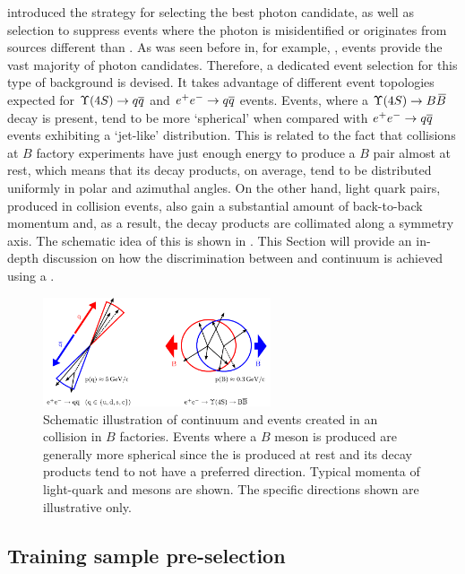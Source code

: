  introduced the strategy for selecting the best photon candidate, 
as well as selection to suppress events 
where the photon is misidentified or originates from sources different than \BtoXsgamma.
As was seen before in, for example, ,
\epem\ra\qqbar events provide the vast majority of photon candidates.
Therefore, a dedicated event selection for this type of background is devised.
It takes advantage of different event topologies expected for $\FourS\to\qqbar$ and $e^+e^-\rightarrow q\overline q$ events.
Events, where a $\FourS\to\BB$ decay is present, tend to be more `spherical' when compared with $e^+e^-\rightarrow q\overline q$ events exhibiting a `jet-like' distribution.
This is related to the fact that \epem collisions at $B$ factory experiments have just enough energy to produce a $B$ pair almost at rest, which means that its decay products, on average, tend to be distributed uniformly in polar and azimuthal angles.
On the other hand, light quark pairs, produced in \epem collision events, also gain a substantial amount of back-to-back momentum and, as a result, the decay products are collimated along a symmetry axis. 
The schematic idea of this is shown in .
This Section will provide an in-depth discussion on how the discrimination between \BtoXsgamma and continuum is achieved using a \BDT.

\begin{figure}[hbtp!]
    \centering
    \includegraphics[width=0.6\textwidth]{figures/continuum_suppression/figure_continuum_suppression_event_shapes.pdf}
    \caption{\label{fig:continuum_schematic} Schematic illustration of continuum and \BB events created in an \epem collision in $B$ factories.
    Events where a $B$ meson is produced are generally more spherical since the \FourS is produced at rest and its decay products tend to not have a preferred direction.
    Typical momenta of light-quark and \BB mesons are shown.
    The specific directions shown are illustrative only. 
    }
\end{figure}

\subsection{Training sample pre-selection}\label{sec:preselection}

